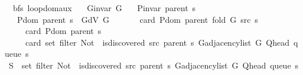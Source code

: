 \begin{isabellebody}
\isanewline
{}\isamarkupfalse%
%
\endisatagproof
{\isafoldproof}%
%
\isadelimproof
\isanewline
%
\endisadelimproof
%
\isadeliminvisible
\isanewline
%
\endisadeliminvisible
%
\isataginvisible
{}\isamarkupfalse%
\ {\isacharparenleft}{\kern0pt}\ bfs{\isacharparenright}{\kern0pt}\ loop{\isacharunderscore}{\kern0pt}dom{\isacharunderscore}{\kern0pt}aux{\isacharcolon}{\kern0pt}\isanewline
\ \ \ {\isachardoublequoteopen}G{\isachardot}{\kern0pt}invar\ G{\isachardoublequoteclose}\isanewline
\ \ \ {\isachardoublequoteopen}P{\isacharunderscore}{\kern0pt}invar\ {\isacharparenleft}{\kern0pt}parent\ s{\isacharparenright}{\kern0pt}{\isachardoublequoteclose}\isanewline
\ \ \ {\isachardoublequoteopen}P{\isachardot}{\kern0pt}dom\ {\isacharparenleft}{\kern0pt}parent\ s{\isacharparenright}{\kern0pt}\ {\isasymsubseteq}\ G{\isachardot}{\kern0pt}dV\ G{\isachardoublequoteclose}\isanewline
\ \ \isanewline
\ \ \ \ {\isachardoublequoteopen}card\ {\isacharparenleft}{\kern0pt}P{\isachardot}{\kern0pt}dom\ {\isacharparenleft}{\kern0pt}parent\ {\isacharparenleft}{\kern0pt}fold\ G\ src\ s{\isacharparenright}{\kern0pt}{\isacharparenright}{\kern0pt}{\isacharparenright}{\kern0pt}\ {\isacharequal}{\kern0pt}\isanewline
\ \ \ \ \ card\ {\isacharparenleft}{\kern0pt}P{\isachardot}{\kern0pt}dom\ {\isacharparenleft}{\kern0pt}parent\ s{\isacharparenright}{\kern0pt}{\isacharparenright}{\kern0pt}\ {\isacharplus}{\kern0pt}\isanewline
\ \ \ \ \ card\ {\isacharparenleft}{\kern0pt}set\ {\isacharparenleft}{\kern0pt}filter\ {\isacharparenleft}{\kern0pt}Not\ {\isasymcirc}\ is{\isacharunderscore}{\kern0pt}discovered\ src\ {\isacharparenleft}{\kern0pt}parent\ s{\isacharparenright}{\kern0pt}{\isacharparenright}{\kern0pt}\ {\isacharparenleft}{\kern0pt}G{\isachardot}{\kern0pt}adjacency{\isacharunderscore}{\kern0pt}list\ G\ {\isacharparenleft}{\kern0pt}Q{\isacharunderscore}{\kern0pt}head\ {\isacharparenleft}{\kern0pt}queue\ s{\isacharparenright}{\kern0pt}{\isacharparenright}{\kern0pt}{\isacharparenright}{\kern0pt}{\isacharparenright}{\kern0pt}{\isacharparenright}{\kern0pt}{\isachardoublequoteclose}%
\endisataginvisible
{\isafoldinvisible}%
%
\isadeliminvisible
\isanewline
%
\endisadeliminvisible
%
\isadelimproof
%
\endisadelimproof
%
\isatagproof
{}\isamarkupfalse%
\ {\isacharminus}{\kern0pt}\isanewline
\ \ \isamarkupfalse%
\ {\isacharquery}{\kern0pt}S\ {\isacharequal}{\kern0pt}\ {\isachardoublequoteopen}set\ {\isacharparenleft}{\kern0pt}filter\ {\isacharparenleft}{\kern0pt}Not\ {\isasymcirc}\ is{\isacharunderscore}{\kern0pt}discovered\ src\ {\isacharparenleft}{\kern0pt}parent\ s{\isacharparenright}{\kern0pt}{\isacharparenright}{\kern0pt}\ {\isacharparenleft}{\kern0pt}G{\isachardot}{\kern0pt}adjacency{\isacharunderscore}{\kern0pt}list\ G\ {\isacharparenleft}{\kern0pt}Q{\isacharunderscore}{\kern0pt}head\ {\isacharparenleft}{\kern0pt}queue\ s{\isacharparenright}{\kern0pt}{\isacharparenright}{\kern0pt}{\isacharparenright}{\kern0pt}{\isacharparenright}{\kern0pt}{\isachardoublequoteclose}\isanewline

\end{isabellebody}
